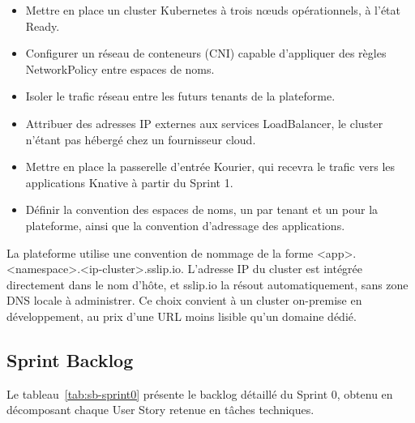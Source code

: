 \begin{itemize}
    \item Mettre en place un cluster Kubernetes à trois nœuds opérationnels, à l'état Ready.
    \item Configurer un réseau de conteneurs (CNI) capable d'appliquer des règles NetworkPolicy entre espaces de noms.
    \item Isoler le trafic réseau entre les futurs tenants de la plateforme.
    \item Attribuer des adresses IP externes aux services LoadBalancer, le cluster n'étant pas hébergé chez un fournisseur cloud.
    \item Mettre en place la passerelle d'entrée Kourier, qui recevra le trafic vers les applications Knative à partir du Sprint 1.
    \item Définir la convention des espaces de noms, un par tenant et un pour la plateforme, ainsi que la convention d'adressage des applications.
\end{itemize}

La plateforme utilise une convention de nommage de la forme <app>.<namespace>.<ip-cluster>.sslip.io. L'adresse IP du cluster est intégrée directement dans le nom d'hôte, et sslip.io la résout automatiquement, sans zone DNS locale à administrer. Ce choix convient à un cluster on-premise en développement, au prix d'une URL moins lisible qu'un domaine dédié.

\subsection{Sprint Backlog}
Le tableau~\ref{tab:sb-sprint0} présente le backlog détaillé du Sprint 0, obtenu en décomposant chaque User Story retenue en tâches techniques.

